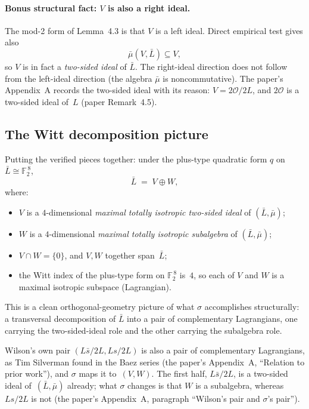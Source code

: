 \documentclass[11pt]{amsart}
\newcommand{\FF}{\mathbb{F}}
\begin{document}
\paragraph{Bonus structural fact: $V$ is also a right ideal.}
The mod-2 form of Lemma~4.3 is that $V$ is a left ideal.
Direct empirical test gives also
\[ \bar\mu(V, \bar L) \subseteq V, \]
so $V$ is in fact a \emph{two-sided ideal} of $\bar L$. The right-ideal
direction does not follow from the left-ideal direction (the algebra
$\bar\mu$ is noncommutative). The paper's Appendix~A
records the two-sided ideal with its reason: $V = 2\mathcal O/2L$, and
$2\mathcal O$ is a two-sided ideal of~$L$ (paper Remark~4.5).

\subsection*{The Witt decomposition picture}

Putting the verified pieces together: under the plus-type quadratic
form $q$ on $\bar L \cong \FF_2^{\,8}$,
\begin{equation}\label{eq:witt}
  \bar L \;=\; V \oplus W,
\end{equation}
where:
\begin{itemize}
\item $V$ is a $4$-dimensional \emph{maximal totally isotropic
  two-sided ideal} of $(\bar L, \bar\mu)$;
\item $W$ is a $4$-dimensional \emph{maximal totally isotropic
  subalgebra} of $(\bar L, \bar\mu)$;
\item $V \cap W = \{0\}$, and $V, W$ together span~$\bar L$;
\item the Witt index of the plus-type form on $\FF_2^{\,8}$ is~$4$,
  so each of $V$ and $W$ is a maximal isotropic subspace
  (Lagrangian).
\end{itemize}

This is a clean orthogonal-geometry picture of what
$\sigma$ accomplishes structurally: a transversal decomposition of
$\bar L$ into a pair of complementary Lagrangians, one carrying the
two-sided-ideal role and the other carrying the subalgebra role.

Wilson's own pair $(L\bar s/2L, Ls/2L)$ is also a pair of complementary
Lagrangians, as Tim Silverman found in the Baez series (the paper's
Appendix~A, ``Relation to prior work''), and $\sigma$ maps it to~$(V, W)$. The first half,
$L\bar s/2L$, is a two-sided ideal of~$(\bar L, \bar\mu)$ already; what
$\sigma$ changes is that $W$ is a subalgebra, whereas $Ls/2L$ is not (the
paper's Appendix~A, paragraph ``Wilson's pair and $\sigma$'s pair'').
\end{document}
